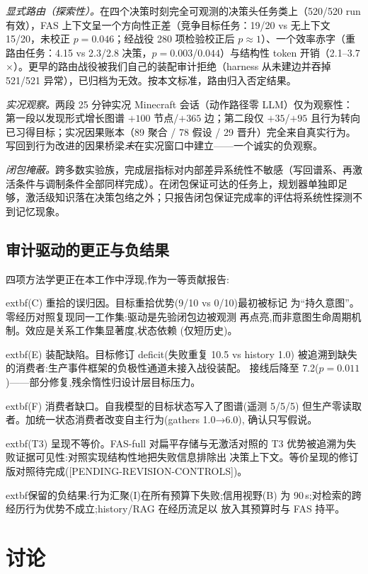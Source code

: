 \documentclass[10pt,a4paper]{ctexart}
\begin{document}
\emph{显式路由（探索性）。}在四个决策时刻完全可观测的决策头任务类上（520/520 run 有效），FAS 上下文呈一个方向性正差（竞争目标任务：19/20 vs 无上下文 15/20，未校正 $p{=}0.046$；经战役 280 项检验校正后 $p{\approx}1$）、一个效率赤字（重路由任务：4.15 vs 2.3/2.8 决策，$p{=}0.003$/$0.044$）与结构性 token 开销（2.1--3.7$\times$）。更早的路由战役被我们自己的装配审计拒绝（harness 从未建边并吞掉 521/521 异常），已归档为无效。按本文标准，路由归入否定结果。

\emph{实况观察。}两段 25 分钟实况 Minecraft 会话（动作路径零 LLM）仅为观察性：第一段以发现形式增长图谱 $+100$ 节点/$+365$ 边；第二段仅 $+35$/$+95$ 且行为转向已习得目标；实况因果账本（89 聚合 / 78 假设 / 29 晋升）完全来自真实行为。写回到行为改进的因果桥梁\emph{未}在实况窗口中建立——一个诚实的负观察。

\emph{闭包掩蔽。}跨多数实验族，完成层指标对内部差异系统性不敏感（写回谱系、再激活条件与调制条件全部同样完成）。在闭包保证可达的任务上，规划器单独即足够，激活级知识落在决策包络之外；只报告闭包保证完成率的评估将系统性探测不到记忆现象。

\subsection{审计驱动的更正与负结果}
\label{sec:audit-negative}

四项方法学更正在本工作中浮现,作为一等贡献报告:

	extbf{(C) 重拾的误归因。}目标重拾优势(9/10 vs 0/10)最初被标记
为``持久意图''。零经历对照复现同一工作集:驱动是先验闭包边被观测
再点亮,而非意图生命周期机制。效应是关系工作集显著度,状态依赖
(仅短历史)。

	extbf{(E) 装配缺陷。}目标修订 deficit(失败重复 10.5 vs history 1.0)
被追溯到缺失的消费者:生产事件框架的负极性通道未接入战役装配。
接线后降至 7.2($p{=}0.011$)——部分修复,残余惰性归设计层目标压力。

	extbf{(F) 消费者缺口。}自我模型的目标状态写入了图谱(遥测 5/5/5)
但生产零读取者。加统一状态消费者改变自主行为(gathers 1.0→6.0),
确认只写假说。

	extbf{(T3) 呈现不等价。}FAS-full 对扁平存储与无激活对照的 T3
优势被追溯为失败证据可见性:对照实现结构性地把失败信息排除出
决策上下文。等价呈现的修订版对照待完成([PENDING-REVISION-CONTROLS])。

	extbf{保留的负结果:}行为汇聚(I)在所有预算下失败;信用视野(B)
为 90\,s;对检索的跨经历行为优势不成立;history/RAG 在经历流足以
放入其预算时与 FAS 持平。

\section{讨论}
\label{sec:discussion}
\end{document}
